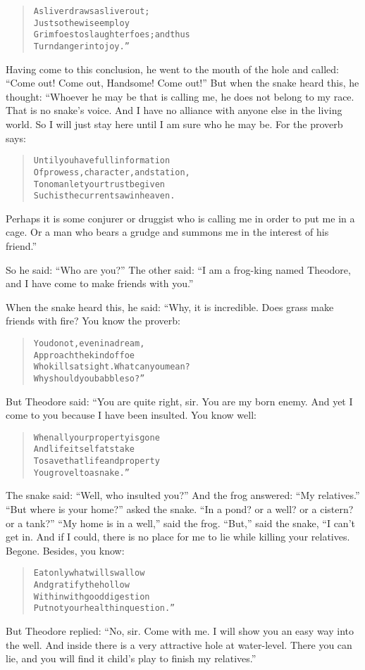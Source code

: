 \documentclass[article, twoside, 14pt]{memoir}
\renewenvironment{verbatim}{%
\begin{quote}%
\vskip -10pt%
\begin{alltt}\normalfont\large}{\end{alltt}%
\end{quote}%
\vskip -10pt
} %
\begin{document}
\begin{verbatim}
A sliver draws a sliver out;
    Just so the wise employ
Grim foes to slaughter foes; and thus
    Turn danger into joy.”
\end{verbatim}
Having come to this conclusion, he went to the mouth of the hole
and called: ``Come out! Come out, Handsome! Come out!'' But
when the snake heard this, he thought: “Whoever he may be that is
calling me, he does not belong to my race. That is no snake's
voice. And I have no alliance with anyone else in the living world.
So I will just stay here until I am sure who he may be. For the
proverb says:

\begin{verbatim}
Until you have full information
Of prowess, character, and station,
To no man let your trust be given{\textemdash}
Such is the current saw in heaven.
\end{verbatim}
Perhaps it is some conjurer or druggist who is calling me in order
to put me in a cage. Or a man who bears a grudge and summons me in
the interest of his friend.”

So he said: ``Who are you?'' The other said:
``I am a frog-king named Theodore, and I have come to make friends with you.''

When the snake heard this, he said: “Why, it is incredible. Does
grass make friends with fire? You know the proverb:

\begin{verbatim}
You do not, even in a dream,
    Approach the kind of foe
Who kills at sight. What can you mean?
    Why should you babble so?”
\end{verbatim}
But Theodore said: “You are quite right, sir. You are my born
enemy. And yet I come to you because I have been insulted. You know
well:

\begin{verbatim}
When all your property is gone
    And life itself at stake{\textemdash}
To save that life and property
    You grovel to a snake.”
\end{verbatim}
The snake said: ``Well, who insulted you?'' And the frog answered:
``My relatives.'' ``But where is your home?'' asked the snake.
``In a pond? or a well? or a cistern? or a tank?''
``My home is in a well,'' said the frog. ``But,'' said the snake,
“I can't get in. And if I could, there is no place for me to lie
while killing your relatives. Begone. Besides, you know:

\begin{verbatim}
Eat only what will swallow
And gratify the hollow
Within with good digestion{\textemdash}
Put not your health in question.”
\end{verbatim}
But Theodore replied:
``No, sir. Come with me. I will show you an easy way into the well. And inside there is a very attractive hole at water-level. There you can lie, and you will find it child's play to finish my relatives.''
\end{document}
